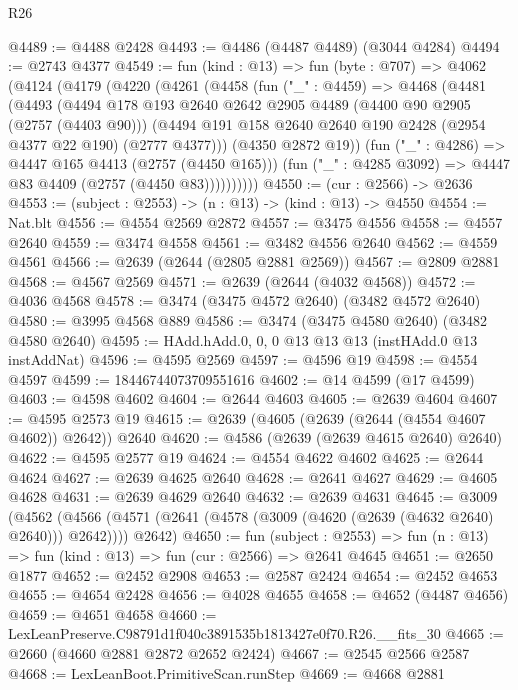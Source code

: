 \begin{lexlean}{R26}
\begin{coremodule}
@4489 := @4488 @2428
@4493 := @4486 (@4487 @4489) (@3044 @4284)
@4494 := @2743 @4377
@4549 := fun (kind : @13) =>
  fun (byte : @707) =>
  @4062
    (@4124
      (@4179
        (@4220
          (@4261
            (@4458
              (fun ("_" : @4459) =>
              @4468
                (@4481
                  (@4493
                    (@4494
                      @178
                      @193
                      @2640
                      @2642
                      @2905
                      @4489
                      (@4400 @90 @2905 (@2757 (@4403 @90)))
                      (@4494 @191 @158 @2640 @2640 @190 @2428 (@2954 @4377 @22 @190) (@2777 @4377)))
                    (@4350 @2872 @19))
                  (fun ("_" : @4286) => @4447 @165 @4413 (@2757 (@4450 @165)))
                  (fun ("_" : @4285 @3092) => @4447 @83 @4409 (@2757 (@4450 @83))))))))))
@4550 := (cur : @2566) -> @2636
@4553 := (subject : @2553) -> (n : @13) -> (kind : @13) -> @4550
@4554 := Nat.blt
@4556 := @4554 @2569 @2872
@4557 := @3475 @4556
@4558 := @4557 @2640
@4559 := @3474 @4558
@4561 := @3482 @4556 @2640
@4562 := @4559 @4561
@4566 := @2639 (@2644 (@2805 @2881 @2569))
@4567 := @2809 @2881
@4568 := @4567 @2569
@4571 := @2639 (@2644 (@4032 @4568))
@4572 := @4036 @4568
@4578 := @3474 (@3475 @4572 @2640) (@3482 @4572 @2640)
@4580 := @3995 @4568 @889
@4586 := @3474 (@3475 @4580 @2640) (@3482 @4580 @2640)
@4595 := HAdd.hAdd.{0, 0, 0} @13 @13 @13 (instHAdd.{0} @13 instAddNat)
@4596 := @4595 @2569
@4597 := @4596 @19
@4598 := @4554 @4597
@4599 := 18446744073709551616
@4602 := @14 @4599 (@17 @4599)
@4603 := @4598 @4602
@4604 := @2644 @4603
@4605 := @2639 @4604
@4607 := @4595 @2573 @19
@4615 := @2639 (@4605 (@2639 (@2644 (@4554 @4607 @4602)) @2642)) @2640
@4620 := @4586 (@2639 (@2639 @4615 @2640) @2640)
@4622 := @4595 @2577 @19
@4624 := @4554 @4622 @4602
@4625 := @2644 @4624
@4627 := @2639 @4625 @2640
@4628 := @2641 @4627
@4629 := @4605 @4628
@4631 := @2639 @4629 @2640
@4632 := @2639 @4631
@4645 := @3009
    (@4562 (@4566 (@4571 (@2641 (@4578 (@3009 (@4620 (@2639 (@4632 @2640) @2640))) @2642)))) @2642)
@4650 := fun (subject : @2553) =>
  fun (n : @13) => fun (kind : @13) => fun (cur : @2566) => @2641 @4645
@4651 := @2650 @1877
@4652 := @2452 @2908
@4653 := @2587 @2424
@4654 := @2452 @4653
@4655 := @4654 @2428
@4656 := @4028 @4655
@4658 := @4652 (@4487 @4656)
@4659 := @4651 @4658
@4660 := LexLeanPreserve.C98791d1f040c3891535b1813427e0f70.R26.__fits_30
@4665 := @2660 (@4660 @2881 @2872 @2652 @2424)
@4667 := @2545 @2566 @2587
@4668 := LexLeanBoot.PrimitiveScan.runStep
@4669 := @4668 @2881

\end{coremodule}
\end{lexlean}
